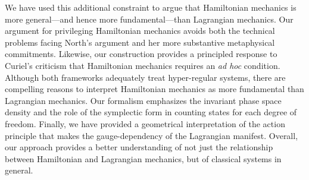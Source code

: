 \documentclass[12pt, english, twoside]{article} %
\newcommand\bs{\begin{singlespace}}
\newcommand\es{\end{singlespace}}
\begin{document}
We have used this additional constraint to argue that Hamiltonian mechanics is more general---and hence more fundamental---than Lagrangian mechanics. Our argument for privileging Hamiltonian mechanics avoids both the technical problems facing North's \parencites*[]{North} argument and her more substantive metaphysical commitments. Likewise, our construction provides a principled response to Curiel's \parencites*[]{Curiel} criticism that Hamiltonian mechanics requires an \textit{ad hoc} condition. Although both frameworks adequately treat hyper-regular systems, there are compelling reasons to interpret Hamiltonian mechanics as more fundamental than Lagrangian mechanics. Our formalism emphasizes the invariant phase space density and the role of the symplectic form in counting states for each degree of freedom. Finally, we have provided a geometrical interpretation of the action principle that makes the gauge-dependency of the Lagrangian manifest. Overall, our approach provides a better understanding of not just the relationship between Hamiltonian and Lagrangian mechanics, but of classical systems in general.



\bs %

\printbibliography[title ={References}]
\es

%
\end{document}
